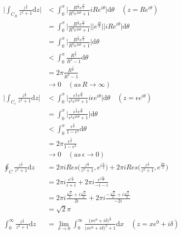 \documentclass[dvipdfmx,a4paper]{jsarticle}
\begin{document}
 \subsection{}
 \begin{align*}
 \biggl|\int_{C_R}\frac{z^{\frac{1}{2}}}{z^2 + 1}\mathrm{d}z\biggr| &< \int_{0}^{\pi}\biggl|\frac{R^{\frac{1}{2}}e^{\frac{i\theta}{2}}}{R^2e^{2i\theta} + 1}iRe^{i\theta}\biggr|\mathrm{d}\theta \quad(z = Re^{i\theta})\\
 &= \int_{0}^{\pi}\biggl|\frac{R^{\frac{1}{2}}e^{\frac{i\theta}{2}}}{R^3e^{2i\theta} + 1}\biggr|\bigl|e^{\frac{i\theta}{2}}\bigr|\bigl|iRe^{i\theta}\bigr|\mathrm{d}\theta\\
 &= \int_{0}^{\pi}\biggl|\frac{R^{\frac{3}{2}}e^{\frac{i\theta}{2}}}{R^2e^{2i\theta} + 1}\biggr|\mathrm{d}\theta\\
 &< \int_{0}^{\pi}\frac{R^{\frac{3}{2}}}{R^2 - 1}\mathrm{d}\theta\\
 &= 2\pi\frac{R^{\frac{3}{2}}}{R^2 - 1}\\
 &\to 0\quad(as\, R \to \infty)\\
 \biggl|\int_{C_{\epsilon}}\frac{z^{\frac{1}{2}}}{z^2 + 1}\mathrm{d}z\biggr| &< \int_{0}^{\pi}\biggl|\frac{\epsilon^{\frac{1}{2}}e^{\frac{i\theta}{2}}}{\epsilon^2e^{2i\theta} + 1}i\epsilon e^{i\theta}\biggr|\mathrm{d}\theta \quad(z = \epsilon e^{i\theta})\\
 &= \int_{0}^{\pi}\biggl|\frac{\epsilon^{\frac{3}{2}}e^{\frac{i\theta}{2}}}{\epsilon^2e^{2i\theta} + 1}\biggr|\mathrm{d}\theta\\
 &< \int_{0}^{\pi}\frac{\epsilon^{\frac{3}{2}}}{1 - \epsilon^2}\mathrm{d}\theta\\
 &= 2\pi\frac{\epsilon^{\frac{3}{2}}}{1 - \epsilon^2}\\
 &\to 0\quad(as \,\epsilon \to 0)\\
 \oint_C\frac{z^{\frac{1}{2}}}{z^2 + 1}\mathrm{d}z &= 2\pi iRes\biggl(\frac{z^{\frac{1}{2}}}{z^2 + 1}, e^{i\frac{\pi}{2}}\biggr) + 2\pi iRes\biggl(\frac{z^{\frac{1}{2}}}{z^2 + 1}, e^{\frac{3\pi}{2}}\biggr)\\
 &= 2\pi i\frac{e^{i\frac{\pi}{4}}}{i + i} + 2\pi i\frac{e^{i\frac{3\pi}{4}}}{-i - i}\\
 &= 2\pi i\frac{\frac{\sqrt{2}}{2} + i\frac{\sqrt{2}}{2}}{2i} + 2\pi i\frac{-\frac{\sqrt{2}}{2} + i\frac{\sqrt{2}}{2}}{-2i}\\
 &= \sqrt{2}\pi\\
 \int_{0}^{\infty} \frac{z^{\frac{1}{2}}}{z^2 + 1} \mathrm{d}z &= \lim_{\delta \to 0}\int_{0}^{\infty} \frac{\bigl(xe^0 + i\delta\bigr)^{\frac{1}{2}}}{\bigl(xe^0 + i\delta\bigr)^2 + 1} \mathrm{d}x \quad(z = xe^0 + i\delta)\\

\end{align*}
\end{document}
